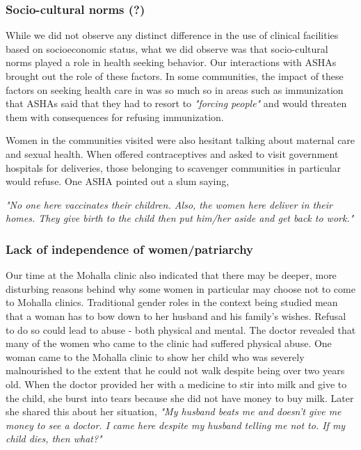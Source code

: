 \subsubsection{Socio-cultural norms (?)}

While we did not observe any distinct difference in the use of clinical facilities based on socioeconomic status, what we did observe was that socio-cultural norms played a role in health seeking behavior. Our interactions with ASHAs brought out the role of these factors. In some communities, the impact of these factors on seeking health care in was so much so in areas such as immunization that ASHAs said that they had to resort to \textit{"forcing people"} and would threaten them with consequences for refusing immunization.

Women in the communities visited were also hesitant talking about maternal care and sexual health. When offered contraceptives and asked to visit government hospitals for deliveries, those belonging to scavenger communities in particular would refuse. One ASHA pointed out a slum saying,

\textit{"No one here vaccinates their children. Also, the women here deliver in their homes. They give birth to the child then put him/her aside and get back to work."} 

\subsubsection{Lack of independence of women/patriarchy}


Our time at the Mohalla clinic also indicated that there may be deeper, more disturbing reasons behind why some women in particular may choose not to come to Mohalla clinics. Traditional gender roles in the context being studied mean that a woman has to bow down to her husband and his family's wishes. Refusal to do so could lead to abuse - both physical and mental. The doctor revealed that many of the women who came to the clinic had suffered physical abuse. One woman came to the Mohalla clinic to show her child who was severely malnourished to the extent that he could not walk despite being over two years old. When the doctor provided her with a medicine to stir into milk and give to the child, she burst into tears because she did not have money to buy milk. Later she shared this about her situation, \textit{"My husband beats me and doesn’t give me money to see a doctor. I came here despite my husband telling me not to. If my child dies, then what?"}

